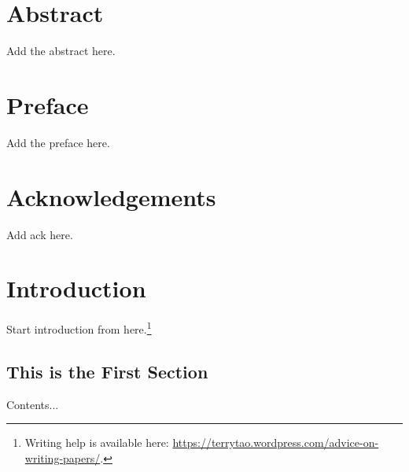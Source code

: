 
\doublespacing

\chapter*{Abstract} 
Add the abstract here.

\setcounter{page}{2}
\renewcommand{\thepage}{\roman{page}} %

\onehalfspacing
\chapter*{Preface} 
Add the preface here.

\chapter*{Acknowledgements} 
Add ack here.

\tableofcontents
\listoftables
\listoffigures
\listofalgorithms {}

\chapter{Introduction} \label{sec: introduction}

\setcounter{page}{1}
\renewcommand{\thepage}{\arabic{page}} %

Start introduction from here.\footnote{Writing help is available here: \url{https://terrytao.wordpress.com/advice-on-writing-papers/}.}

\section{This is the First Section}
Contents...

